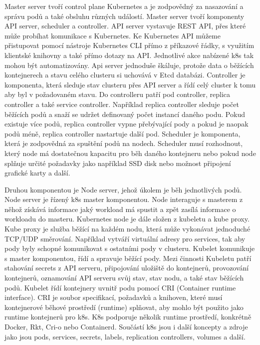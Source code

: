 Master server tvoří control plane Kubernetes a je zodpovědný za nasazování a správu podů a také obsluhu různých událostí. Master server tvoří komponenty API server, scheduler a controller. API server vystavuje REST API, přes které může probíhat komunikace s Kubernetes. Ke Kubernetes API můžeme přistupovat pomocí nástroje Kubernetes CLI přímo z příkazové řádky, s využitím klientské knihovny a také přímo dotazy na API. Jednotlivé akce nabízené k8s tak mohou být automatizovány. Api server jednoduše škáluje, protože data o běžících kontejnerech a stavu celého clusteru si \linebreak uchovává v Etcd databázi. Controller je komponenta, která sleduje stav clusteru přes API server a řídí celý cluster k tomu aby byl v požadovaném stavu. Do controlleru patří pod controller, replica controller a také service controller. Například replica controller sleduje počet běžících podů a snaží se udržet definovaný počet instancí daného podu. Pokud existuje více podů, replica controller vypne přebývající pody a pokud je naopak podů méně, replica controller nastartuje další pod. Scheduler je komponenta, která je zodpovědná za spuštění podů na nodech. Scheduler musí rozhodnout, který node má dostatečnou kapacitu pro běh daného kontejneru nebo pokud node splňuje určité požadavky jako například SSD disk nebo možnost připojení grafické karty a další.     \par          
Druhou komponentou je Node server, jehož úkolem je běh jednotlivých podů. Node server je řízený k8s master komponentou. Node interaguje s masterem z něhož získává informace jaký workload má spustit a zpět zasílá informace o workloadu do masteru. Kubernetes node je dále složen z kubeletu a kube proxy. Kube proxy je služba běžící na každém nodu, která může vykonávat jednoduché TCP/UDP směrování. Například vytváří virtuální adresy pro services, tak aby pody byly schopné komunikovat \linebreak s ostatními pody v clusteru. Kubelet komunikuje s master komponentou, řídí a spravuje běžící pody. Mezi činnosti Kubeletu patří stahování secrets z API serveru, připojování uložiště do kontejnerů, provozování kontejnerů, oznamování API serveru svůj stav, stav nodu, a také stav běžících podů. Kubelet řídí kontejnery uvnitř podu pomocí CRI (Container runtime interface). CRI je soubor specifikací, požadavků a knihoven, které musí kontejnerové běhové prostředí (runtime) splňovat, aby mohlo být použito jako runtime kontejnerů pro k8s. K8s podporuje několik runtime prostředí, konkrétně Docker, Rkt, Cri-o nebo Containerd. Součástí k8s jsou i další koncepty a zdroje jako jsou pods, services, secrets, labels, replication controllers, volumes a další.   \par
